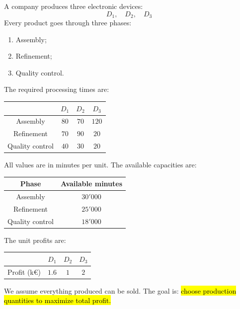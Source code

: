 \highspace
\begin{examplebox}
    A company produces three electronic devices:
    \begin{equation*}
        D_1,\quad D_2,\quad D_3
    \end{equation*}
    Every product goes through three phases:
    \begin{enumerate}
        \item Assembly;
        \item Refinement;
        \item Quality control.
    \end{enumerate}
    The required processing times are:
    \begin{center}
        \begin{tabular}{@{} c | c c c @{}}
            \toprule
            & $D_1$ & $D_2$ & $D_3$\\
            \midrule
            Assembly & $80$ & $70$ & $120$\\
            Refinement & $70$ & $90$ & $20$\\
            Quality control & $40$ & $30$ & $20$\\
            \bottomrule
        \end{tabular}
    \end{center}
    All values are in minutes per unit. The available capacities are:
    \begin{center}
        \begin{tabular}{@{} c | c @{}}
            \toprule
            Phase & Available minutes\\
            \midrule
            Assembly & $30'000$\\
            Refinement & $25'000$\\
            Quality control & $18'000$\\
            \bottomrule
        \end{tabular}
    \end{center}
    The unit profits are:
    \begin{center}
        \begin{tabular}{@{} c | c c c @{}}
            \toprule
            & $D_1$ & $D_2$ & $D_3$\\
            \midrule
            Profit (k\euro) & $1.6$ & $1$ & $2$\\
            \bottomrule
        \end{tabular}
    \end{center}
    We assume everything produced can be sold. The goal is: \hl{choose production quantities to maximize total profit.}


\end{examplebox}
